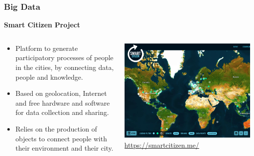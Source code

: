 \documentclass[hyperref={pdfpagelabels=true}]{beamer}
\begin{document}
\begin{frame}
\frametitle{Big Data}
\textbf{Smart Citizen Project}
\begin{columns}
  \begin{column}{0.5\textwidth}\small{ 
    \begin{itemize}
      \item<2->Platform to generate participatory processes of people in the cities, by connecting data, people and knowledge.
      \item<3->Based on geolocation, Internet and free hardware and software for data collection and sharing.
      \item<4->Relies on the production of objects to connect people with their environment and their city.     
      \end{itemize}  }
  \end{column}
  \begin{column}{0.5\textwidth}
    \includegraphics[width=\textwidth]{smart_city.png}\\
    \tiny{\url{https://smartcitizen.me/}}  
  \end{column}  
\end{columns}
\end{frame}
\end{document}
